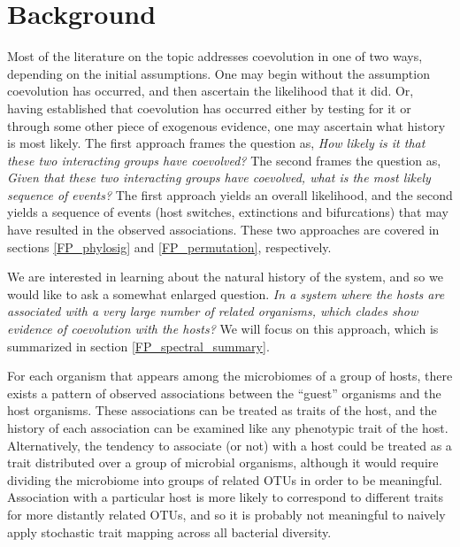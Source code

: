 \section{Background}

Most of the literature on the topic addresses coevolution in one of two ways, depending on the initial assumptions. One may begin without the assumption coevolution has occurred, and then ascertain the likelihood that it did. Or, having established that coevolution has occurred either by testing for it or through some other piece of exogenous evidence, one may ascertain what history is most likely. The first approach frames the question as, {\em How likely is it that these two interacting groups have coevolved?} The second frames the question as, {\em Given that these two interacting groups have coevolved, what is the most likely sequence of events?} The first approach yields an overall likelihood, and the second yields a sequence of events (host switches, extinctions and bifurcations) that may have resulted in the observed associations. These two approaches are covered in sections \ref{FP_phylosig} and \ref{FP_permutation}, respectively.

We are interested in learning about the natural history of the system, and so we would like to ask a somewhat enlarged question. {\em In a system where the hosts are associated with a very large number of related organisms, which clades show evidence of coevolution with the hosts?} We will focus on this approach, which is summarized in section \ref{FP_spectral_summary}. 

For each organism that appears among the microbiomes of a group of hosts, there exists a pattern of observed associations between the ``guest'' organisms and the host organisms. These associations can be treated as traits of the host, and the history of each association can be examined like any phenotypic trait of the host. Alternatively, the tendency to associate (or not) with a host could be treated as a trait distributed over a group of microbial organisms, although it would require dividing the microbiome into groups of related OTUs in order to be meaningful. Association with a particular host is more likely to correspond to different traits for more distantly related OTUs, and so it is probably not meaningful to naively apply stochastic trait mapping across all bacterial diversity.


